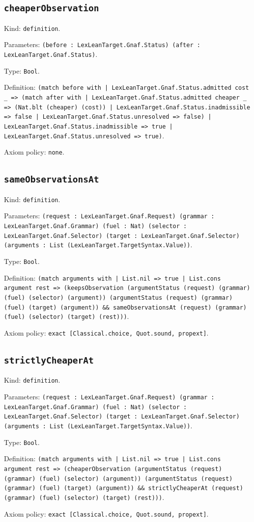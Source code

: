 \documentclass[11pt]{article}
\begin{document}
\subsection*{\texttt{cheaperObservation}}
\noindent Kind: \texttt{definition}.\par
\noindent Parameters: \texttt{(before : LexLeanTarget.Gnaf.Status) (after : LexLeanTarget.Gnaf.Status)}.\par
\noindent Type: \texttt{Bool}.\par
\noindent Definition: \texttt{(match before with | LexLeanTarget.Gnaf.Status.admitted cost \_ => (match after with | LexLeanTarget.Gnaf.Status.admitted cheaper \_ => (Nat.blt (cheaper) (cost)) | LexLeanTarget.Gnaf.Status.inadmissible => false | LexLeanTarget.Gnaf.Status.unresolved => false) | LexLeanTarget.Gnaf.Status.inadmissible => true | LexLeanTarget.Gnaf.Status.unresolved => true)}.\par
\noindent Axiom policy: \texttt{none}.\par
\subsection*{\texttt{sameObservationsAt}}
\noindent Kind: \texttt{definition}.\par
\noindent Parameters: \texttt{(request : LexLeanTarget.Gnaf.Request) (grammar : LexLeanTarget.Gnaf.Grammar) (fuel : Nat) (selector : LexLeanTarget.Gnaf.Selector) (target : LexLeanTarget.Gnaf.Selector) (arguments : List (LexLeanTarget.TargetSyntax.Value))}.\par
\noindent Type: \texttt{Bool}.\par
\noindent Definition: \texttt{(match arguments with | List.nil => true | List.cons argument rest => (keepsObservation (argumentStatus (request) (grammar) (fuel) (selector) (argument)) (argumentStatus (request) (grammar) (fuel) (target) (argument)) \&\& sameObservationsAt (request) (grammar) (fuel) (selector) (target) (rest)))}.\par
\noindent Axiom policy: \texttt{exact [Classical.choice, Quot.sound, propext]}.\par
\subsection*{\texttt{strictlyCheaperAt}}
\noindent Kind: \texttt{definition}.\par
\noindent Parameters: \texttt{(request : LexLeanTarget.Gnaf.Request) (grammar : LexLeanTarget.Gnaf.Grammar) (fuel : Nat) (selector : LexLeanTarget.Gnaf.Selector) (target : LexLeanTarget.Gnaf.Selector) (arguments : List (LexLeanTarget.TargetSyntax.Value))}.\par
\noindent Type: \texttt{Bool}.\par
\noindent Definition: \texttt{(match arguments with | List.nil => true | List.cons argument rest => (cheaperObservation (argumentStatus (request) (grammar) (fuel) (selector) (argument)) (argumentStatus (request) (grammar) (fuel) (target) (argument)) \&\& strictlyCheaperAt (request) (grammar) (fuel) (selector) (target) (rest)))}.\par
\noindent Axiom policy: \texttt{exact [Classical.choice, Quot.sound, propext]}.\par
\end{document}
